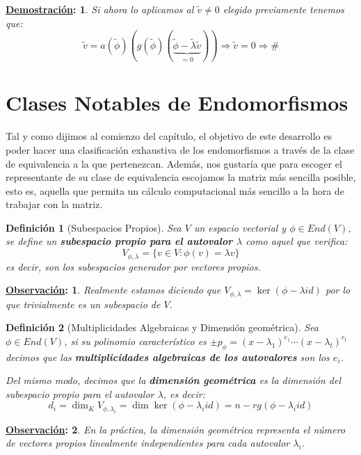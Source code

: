 \documentclass[10pt,a4paper,openright]{book}
\theoremstyle{break}
\newtheorem*{defi}{Definición}
\newtheorem*{demo}{\underline{Demostración}:}
\newtheorem*{obs}{\underline{Observación}:}
\begin{document}
\begin{demo}
Si ahora lo aplicamos al $\tilde{v}\neq 0$ elegido previamente tenemos que:
$$\tilde{v}=a(\tilde{\phi})\left(g(\tilde{\phi})\left(\underbrace{\tilde{\phi}-\tilde{\lambda}\tilde{v}}_{=0}\right)\right)\Rightarrow \tilde{v}=0\Rightarrow\#$$
\end{demo}


\section{Clases Notables de Endomorfismos}
Tal y como dijimos al comienzo del capítulo, el objetivo de este desarrollo es poder hacer una clasificación exhaustiva de los endomorfismos a través de la clase de equivalencia a la que pertenezcan. Además, nos gustaría que para escoger el representante de su clase de equivalencia escojamos la matriz más sencilla posible, esto es, aquella que permita un cálculo computacional más sencillo a la hora de trabajar con la matriz.


\begin{defi}[Subespacios Propios]
Sea $V$ un espacio vectorial y $\phi  \in End(V)$, se define un \textbf{subespacio propio para el autovalor $\lambda$} como aquel que verifica:
$$V_{\phi, \lambda}=\{v\in V : \phi(v) = \lambda v\}$$
es decir, son los subespacios generador por vectores propios.
\end{defi}

\begin{obs}
Realmente estamos diciendo que $V_{\phi,\lambda} = \ker(\phi-\lambda id)$ por lo que trivialmente es un subespacio de $V$.
\end{obs}

\begin{defi}[Multiplicidades Algebraicas y Dimensión geométrica]
Sea $\phi \in End(V)$, si su polinomio característico es $\pm p_\phi=(x-\lambda_1)^{e_1}\cdots (x-\lambda_t)^{e_t}$ decimos que las \textbf{multiplicidades algebraicas de los autovalores} son los $e_i$.

Del mismo modo, decimos que la \textbf{dimensión geométrica} es la dimensión del subespacio propio para el autovalor $\lambda$, es decir:
$$d_i=\dim_K V_{\phi,\lambda_i} = \dim \ker(\phi-\lambda_i id)= n - rg(\phi-\lambda_i id)$$
\end{defi}
\begin{obs}
En la práctica, la dimensión geométrica representa el número de vectores propios linealmente independientes para cada autovalor $\lambda_i$.
\end{obs}
\end{document}
